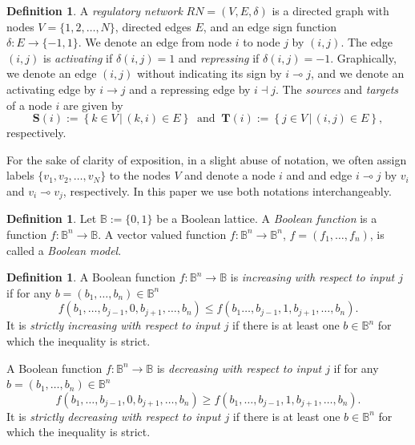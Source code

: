 \documentclass[12pt, notitlepage]{amsart}
\newcommand{\setdef}[2]{\left\{{#1}\,\left|\,{#2}\right.\right\}}
\theoremstyle{definition}
\newtheorem{defn}[thm]{Definition}
\newcommand{\Targets}{\mathbf{T}}
\newcommand{\Sources}{\mathbf{S}}
\newcommand{\bbB}{\mathbb{B}}
\begin{document}
  \begin{defn}
    \label{def:RN}
    A \textit{regulatory network} $RN = (V, E, \delta)$ is a directed graph with nodes $V = \{ 1, 2, \ldots, N \}$, directed edges $E$, and an edge sign function $\delta \colon E \to \{-1, 1\}$. We denote an edge from node $i$ to node $j$ by $(i, j)$. The edge $(i, j)$ is \textit{activating} if $\delta(i, j) = 1$ and \textit{repressing} if $\delta(i, j) = -1$. Graphically, we denote an edge $(i, j)$ without indicating its sign by
    $i \multimap j$, and we denote an activating edge by $i \to j$ and a repressing edge by $i \dashv j$. The \textit{sources} and \textit{targets} of a node $i$ are given by
    \[
      \Sources(i):= \setdef{k \in V}{(k, i) \in E} \ \text{ and } \ \Targets(i):= \setdef{j \in V}{(i, j) \in E},
    \]
    respectively.
  \end{defn}

  For the sake of clarity of exposition, in a slight abuse of notation, we often assign labels $\{ v_1, v_2, \ldots, v_N \}$ to the nodes $V$ and denote a node $i$ and and edge $i \multimap j$ by $v_i$ and $v_i \multimap v_j$, respectively. In this paper we use both notations interchangeably.

  \begin{defn}
    \label{def:lattice}
    Let $\bbB := \{ 0, 1 \}$ be a Boolean lattice. A \emph{Boolean function} is a function $f \colon \bbB^n \to \bbB$. A vector valued function $f \colon \bbB^n \to \bbB^n$, $f = (f_1, \ldots, f_n)$, is called a \emph{Boolean model}.
  \end{defn}

  \begin{defn}
    A Boolean function $f \colon \bbB^n \to \bbB$ is \emph{increasing  with respect to input $j$} if for any $b = (b_1, \ldots, b_n) \in \bbB^n$
    \[
      f(b_1, \ldots, b_{j-1}, 0, b_{j+1}, \ldots, b_n) \leq f(b_1 \ldots, b_{j-1}, 1, b_{j+1}, \ldots, b_n).
    \]
    It is \emph{strictly increasing  with respect to input $j$} if there is at least one $b \in \bbB^n$ for which the inequality is strict.

    A Boolean function $f \colon \bbB^n \to \bbB$ is \emph{decreasing  with respect to input $j$} if for any $b = (b_1, \ldots, b_n) \in \bbB^n$
    \[
      f(b_1, \ldots, b_{j-1}, 0, b_{j+1}, \ldots, b_n) \geq f(b_1, \ldots, b_{j-1}, 1, b_{j+1}, \ldots, b_n).
    \]
    It is \emph{strictly decreasing with respect to input $j$} if there is at least one $b \in \bbB^n$ for which the inequality is strict.
  \end{defn}
\end{document}
